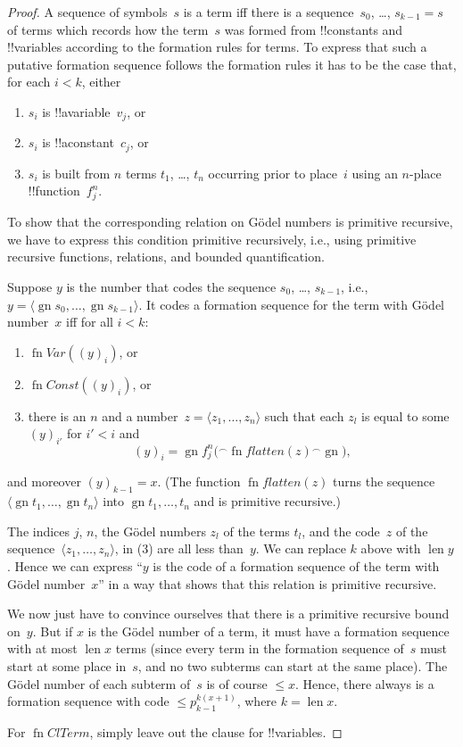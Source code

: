 \documentclass[10pt,a4paper]{article}
\theoremstyle{plain}
\theoremstyle{definition}
\theoremstyle{remark}
\providecommand{\Obj}{}
\providecommand{\tuple}[1]{\langle #1 \rangle}
\providecommand{\len}{\operatorname{len}}
\providecommand{\concat}{\mathbin{{}^\frown}}
\providecommand{\Gn}{\operatorname{gn}}
\providecommand{\fn}{\operatorname{fn}}
\providecommand{\fn}{\operatorname{fn}}
\begin{document}
\begin{proof}
A sequence of symbols~$s$ is a term iff there is a sequence~$s_0$,
\dots, $s_{k-1} = s$ of terms which records how the term~$s$ was formed
from !!{constant}s and !!{variable}s according to the formation rules
for terms. To express that such a putative formation sequence follows
the formation rules it has to be the case that, for each $i < k$, either
\begin{enumerate}
\item $s_i$ is !!a{variable}~$\Obj v_j$, or
\item $s_i$ is !!a{constant}~$\Obj c_j$, or
\item $s_i$ is built from $n$ terms $t_1$, \dots, $t_n$ occurring
  prior to place~$i$ using an $n$-place !!{function}~$\Obj f^n_j$.
\end{enumerate}
To show that the corresponding relation on G\"odel numbers is
primitive recursive, we have to express this condition primitive
recursively, i.e., using primitive recursive functions, relations, and
bounded quantification.

Suppose $y$ is the number that codes the sequence $s_0$, \dots, $s_{k-1}$,
i.e., $y = \tuple{\Gn{s_0}, \dots, \Gn{s_{k-1}}}$.  It codes a formation
sequence for the term with G\"odel number~$x$ iff for all $i < k$:
\begin{enumerate}
\item $\fn{Var}((y)_i)$, or
\item $\fn{Const}((y)_i)$, or
\item there is an $n$ and a number~$z = \tuple{z_1, \dots, z_n}$ such
  that each $z_l$ is equal to some $(y)_{i'}$ for $i' < i$ and
\[
(y)_i = \Gn{\Obj f^n_j(} \concat \fn{flatten}(z) \concat \Gn{)},
\]
\end{enumerate}
and moreover $(y)_{k-1} = x$.  (The function $\fn{flatten}(z)$ turns
the sequence $\tuple{\Gn{t_1}, \dots, \Gn{t_n}}$ into $\Gn{t_1, \dots,
  t_n}$ and is primitive recursive.)

The indices $j$, $n$, the G\"odel numbers $z_l$ of the terms $t_l$,
and the code~$z$ of the sequence~$\tuple{z_1, \dots, z_n}$, in (3) are
all less than~$y$.  We can replace $k$ above with $\len{y}$.  Hence we
can express ``$y$ is the code of a formation sequence of the term with
G\"odel number~$x$'' in a way that shows that this relation is
primitive recursive.

We now just have to convince ourselves that there is a primitive
recursive bound on~$y$.  But if $x$ is the G\"odel number of a term,
it must have a formation sequence with at most $\len{x}$ terms (since
every term in the formation sequence of~$s$ must start at some place
in~$s$, and no two subterms can start at the same place).  The G\"odel
number of each subterm of~$s$ is of course $\le x$.  Hence, there
always is a formation sequence with code $\le p_{k-1}^{k(x+1)}$, where
$k=\len{x}$.

For $\fn{ClTerm}$, simply leave out the clause for !!{variable}s.
\end{proof}
\end{document}
